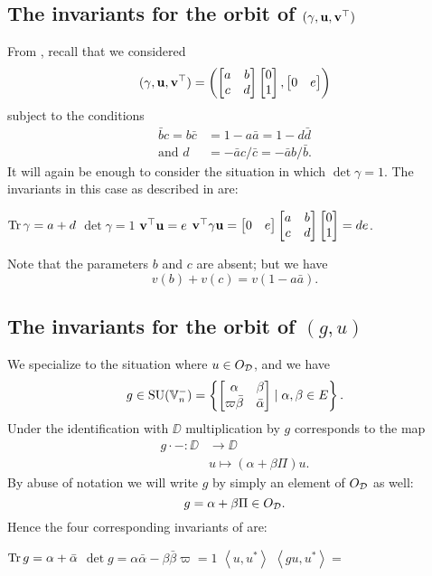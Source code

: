 \subsection{The invariants for the orbit of ${(\gamma, \mathbf u, \mathbf v^\top)}$}
From , recall that we considered
\[
  (\gamma, \mathbf u, \mathbf v^\top)
  =
  \left( \begin{bmatrix} a & b \\ c & d \end{bmatrix}
    \begin{bmatrix} 0 \\ 1 \end{bmatrix}, \begin{bmatrix} 0 & e \end{bmatrix} \right)
\]
subject to the conditions
\begin{align*}
  \bar b c = b \bar c &= 1 - a \bar a = 1 - d \bar d \\
  \text{and } d &= - \bar a c / \bar c = -\bar a b / \bar b.
\end{align*}
It will again be enough to consider the situation in which $\det \gamma = 1$.
The invariants in this case as described in  are:
\begin{itemize}
  \ii $\operatorname{Tr} \gamma = a + d$
  \ii $\det \gamma = 1$
  \ii $\mathbf v^\top \mathbf u = e$
  \ii $\mathbf v^\top \gamma \mathbf u = \begin{bmatrix} 0 & e \end{bmatrix}
  \begin{bmatrix} a & b \\ c & d \end{bmatrix} \begin{bmatrix} 0 \\ 1 \end{bmatrix} = de$.
\end{itemize}
Note that the parameters $b$ and $c$ are absent; but we have
\[ v(b) + v(c) = v(1 - a \bar a). \]

\subsection{The invariants for the orbit of $(g,u)$}
We specialize to the situation where $u \in O_\mathcal D$, and we have
\[ g \in \operatorname{SU}(\mathbb V_n^-) = \left\{
    \begin{bmatrix} \alpha & \beta \\ \varpi\bar\beta & \bar\alpha \end{bmatrix}
    \mid \alpha, \beta \in E \right\}. \]
Under the identification with $\DD$ multiplication by $g$ corresponds to the map
\begin{align*}
  g \cdot - \colon \DD &\to \DD \\
  & u \mapsto (\alpha + \beta \Pi) u.
\end{align*}
By abuse of notation we will write $g$ by simply an element of $O_\mathcal D$ as well:
\[ g = \alpha + \beta \Pi \in O_\mathcal D. \]
Hence the four corresponding invariants of  are:
\begin{itemize}
  \ii $\operatorname{Tr} g = \alpha + \bar\alpha$
  \ii $\det g = \alpha \bar \alpha - \beta \bar\beta \varpi = 1$
  \ii $\left\langle u, u^\ast \right\rangle$
  \ii $\left\langle gu, u^\ast \right\rangle = $
\end{itemize}
